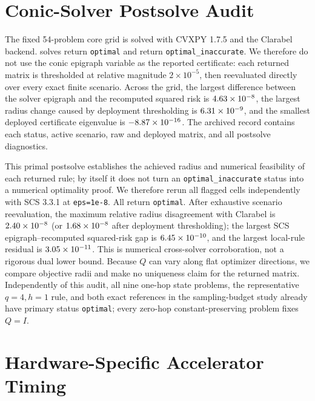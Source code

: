 \documentclass[journal,10pt]{IEEEtran}
\begin{document}
\section{Conic-Solver Postsolve Audit}

The fixed 54-problem core grid is solved with CVXPY 1.7.5 and the Clarabel
backend.  \CorePrimaryOptimalCount{} solves return \texttt{optimal} and
\CorePrimaryInaccurateCount{} return
\texttt{optimal\_inaccurate}.  We therefore do not use the conic epigraph
variable as the reported certificate: each returned matrix is thresholded at
relative magnitude $2\times10^{-5}$, then reevaluated directly over every
exact finite scenario.  Across the grid, the largest difference between the
solver epigraph and the recomputed squared risk is
$4.63\times 10^{-8}$, the largest radius change caused by deployment
thresholding is $6.31\times 10^{-9}$, and the smallest deployed
certificate eigenvalue is $-8.87\times 10^{-16}$.  The
archived record contains each status,
active scenario, raw and deployed matrix, and all postsolve diagnostics.

This primal postsolve establishes the achieved radius and numerical
feasibility of each returned rule; by itself it does not turn an
\texttt{optimal\_inaccurate} status into a numerical optimality proof.  We
therefore rerun all \CrosscheckCount{} flagged cells independently with SCS
3.3.1 at \texttt{eps=1e-8}.  All return \texttt{optimal}.  After exhaustive
scenario reevaluation, the maximum relative radius disagreement with Clarabel
is $2.40\times 10^{-8}$ (or
$1.68\times 10^{-8}$ after deployment thresholding); the
largest SCS epigraph--recomputed squared-risk gap is
$6.45\times 10^{-10}$, and the largest local-rule residual is
$3.05\times 10^{-11}$.  This is numerical cross-solver corroboration,
not a rigorous dual lower bound.  Because $Q$ can vary along flat optimizer
directions, we compare objective radii and make no uniqueness claim for the
returned matrix.  Independently of
this audit, all nine one-hop state problems, the representative $q=4,h=1$
rule, and both exact references in the sampling-budget study already have
primary status \texttt{optimal}; every zero-hop constant-preserving problem
fixes $Q=I$.

\section{Hardware-Specific Accelerator Timing}
\end{document}
